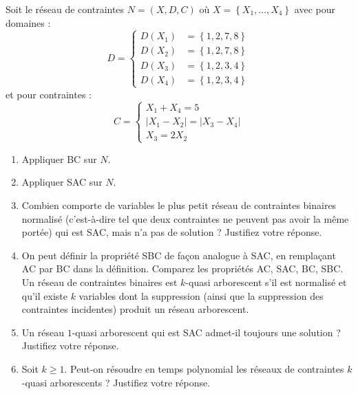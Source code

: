 \begin{td-exo}
    Soit le réseau de contraintes \(N = (X, D, C)\) où \(X = \left\{X_1,\ldots,X_4\right\}\) avec pour domaines :
    \begin{equation*}
        D = 
        \begin{cases}
            D(X_1) &= \left\{1, 2, 7, 8\right\} \\
            D(X_2) &= \left\{1, 2, 7, 8\right\} \\
            D(X_3) &= \left\{1, 2, 3, 4\right\} \\
            D(X_4) &= \left\{1, 2, 3, 4\right\}
        \end{cases}
    \end{equation*}
    et pour contraintes :
    \begin{equation*}
        C = 
        \begin{cases}
            X_1 + X_4 = 5 \\
            |X_1 - X_2| = |X_3 - X_4| \\
            X_3 = 2 X_2
        \end{cases}
    \end{equation*}
    \begin{enumerate}
        \item Appliquer BC sur \(N\).

        \item Appliquer SAC sur \(N\).

        \item Combien comporte de variables le plus petit réseau de contraintes binaires normalisé (c'est-à-dire tel que deux contraintes ne peuvent pas avoir la même portée) qui est SAC, mais n'a pas de solution ? Justifiez votre réponse.

        \item On peut définir la propriété SBC de façon analogue à SAC, en remplaçant AC par BC dans la définition. Comparez les propriétés AC, SAC, BC, SBC.\\
        Un réseau de contraintes binaires est \(k\)-quasi arborescent s'il est normalisé et qu'il existe \(k\) variables dont la suppression (ainsi que la suppression des contraintes incidentes) produit un réseau arborescent.

        \item Un réseau \(1\)-quasi arborescent qui est SAC admet-il toujours une solution ? Justifiez votre réponse.

        \item Soit \(k\geq 1\). Peut-on résoudre en temps polynomial les réseaux de contraintes \(k\)-quasi arborescents ? Justifiez votre réponse.
    \end{enumerate}
\end{td-exo}